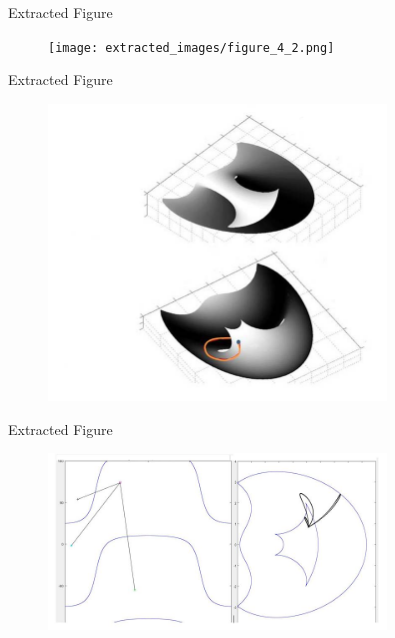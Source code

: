 \documentclass{beamer}
\begin{document}
\begin{frame}{Extracted Figure}
    \centering
    \begin{figure}
        \texttt{[image: extracted\_images/figure\_4\_2.png]}  %
    \end{figure}
\end{frame}

\begin{frame}{Extracted Figure}
    \centering
    \begin{figure}
        \includegraphics[width=0.8\textwidth]{extracted_images/figure_7_1.png}  %
    \end{figure}
\end{frame}

\begin{frame}{Extracted Figure}
    \centering
    \begin{figure}
        \includegraphics[width=0.8\textwidth]{extracted_images/figure_8_1.png}  %
    \end{figure}
\end{frame}
\end{document}
